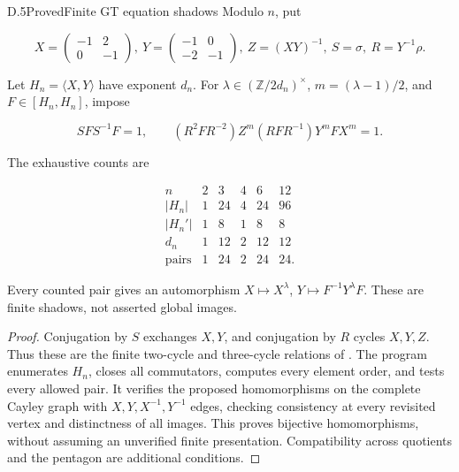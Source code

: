 \begin{statement}{D.5}{Proved}{Finite GT equation shadows}
Modulo $n$, put

$$
X=\begin{pmatrix}-1&2\\0&-1\end{pmatrix},\
 Y=\begin{pmatrix}-1&0\\-2&-1\end{pmatrix},\
 Z=(XY)^{-1},\ S=\sigma,\ R=Y^{-1}\rho.
$$

Let $H_n=\langle X,Y\rangle$ have exponent $d_n$.
For $\lambda\in(\mathbb Z/2d_n)^\times$, $m=(\lambda-1)/2$,
and $F\in[H_n,H_n]$, impose

$$
SFS^{-1}F=1,\qquad
 (R^2FR^{-2})Z^m(RFR^{-1})Y^mFX^m=1.
$$

The exhaustive counts are

$$
\begin{array}{c|rrrrr}
n&2&3&4&6&12\\\hline
|H_n|&1&24&4&24&96\\
|H_n'|&1&8&1&8&8\\
d_n&1&12&2&12&12\\
\text{pairs}&1&24&2&24&24.
\end{array}
$$

Every counted pair gives an automorphism
$X\mapsto X^\lambda$, $Y\mapsto F^{-1}Y^\lambda F$.
These are finite shadows, not asserted global images.
\end{statement}
\begin{proof}
Conjugation by $S$ exchanges $X,Y$, and conjugation by $R$
cycles $X,Y,Z$. Thus these are the finite two-cycle and
three-cycle relations of \cite[Section 0.1]{D_HS}.
The program enumerates $H_n$, closes all commutators,
computes every element order, and tests every allowed pair.
It verifies the proposed homomorphisms on the complete
Cayley graph with $X,Y,X^{-1},Y^{-1}$ edges, checking
consistency at every revisited vertex and distinctness
of all images. This proves bijective homomorphisms,
without assuming an unverified finite presentation.
Compatibility across quotients and the pentagon are
additional conditions.
\end{proof}

